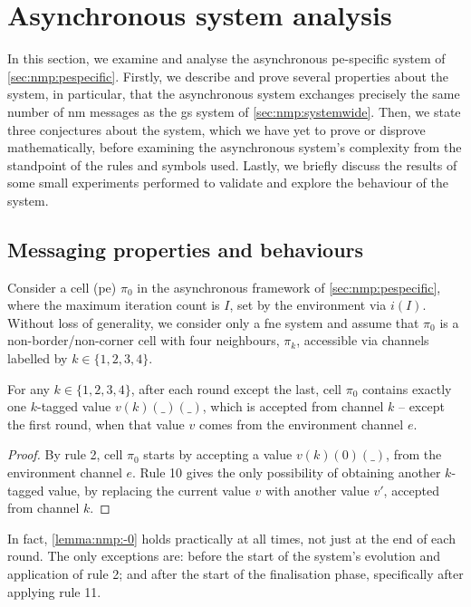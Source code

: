 \section{\label{sec:nmp:analysis}Asynchronous system analysis}

In this section, we examine and analyse the asynchronous \gls{pe}-specific system of \cref{sec:nmp:pespecific}.  Firstly, we describe and prove several properties about the system, in particular, that the asynchronous system exchanges precisely the same number of \gls{nm} messages as the \gls{gs} system of \cref{sec:nmp:systemwide}.  Then, we state three conjectures about the system, which we have yet to prove or disprove mathematically, before examining the asynchronous system's complexity from the standpoint of the rules and symbols used.  Lastly, we briefly discuss the results of some small experiments performed to validate and explore the behaviour of the system.

\subsection{\label{sec:nmp:msgprops}Messaging properties and behaviours}

Consider a cell (\gls{pe}) $\pi_0$ in the asynchronous framework of \cref{sec:nmp:pespecific},
where the maximum iteration count is $I$, set by the environment via $i(I)$.
Without loss of generality, 
we consider only a \gls{fne} system and
assume that $\pi_0$ is a non-border/non-corner cell with four neighbours, 
$\pi_k$, accessible via channels labelled by $k \in \{ 1, 2, 3, 4 \}$. 

\begin{lemma}\label{lemma:nmp:-0}
    For any $k \in \{ 1, 2, 3, 4 \}$, after each round except the last,
    cell $\pi_0$ contains exactly one $k$-tagged value $v(k)(\_)(\_)$, 
    which is accepted from channel $k$ 
    -- except the first round, when that value $v$ comes from the environment channel $e$.
\end{lemma}

\begin{proof}
    By rule 2, cell $\pi_0$ starts by accepting a value $v(k)(0)(\_)$, from the environment channel $e$.
    Rule 10 gives the only possibility of obtaining another $k$-tagged value, by replacing the current value $v$ with another value $v'$, accepted from channel $k$. %
\end{proof}

\begin{remark}
    In fact, \cref{lemma:nmp:-0} holds practically at all times, not just at the end of each round.  The only exceptions are: before the start of the system's evolution and application of rule 2; and after the start of the finalisation phase, specifically after applying rule 11.
\end{remark}

